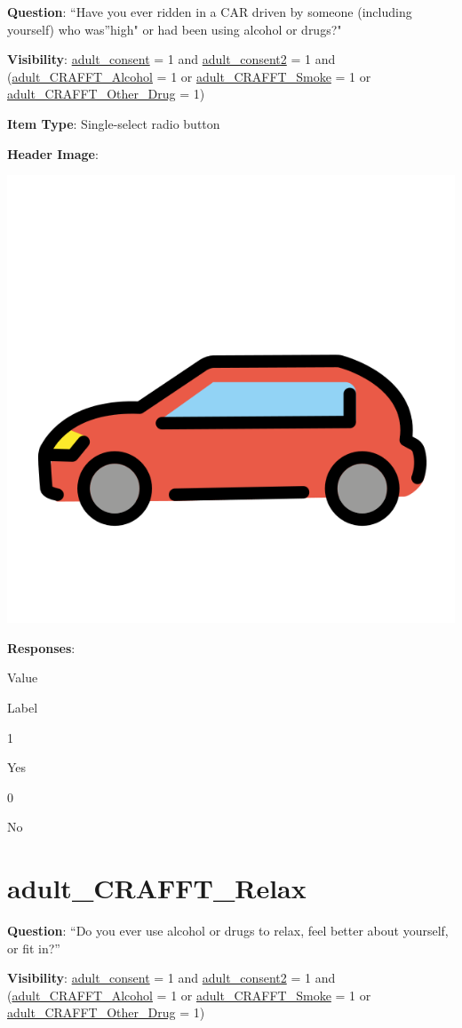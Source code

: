 \documentclass[]{book}
\begin{document}
\textbf{Question}: ``Have you ever ridden in a CAR driven by someone (including yourself) who was''high" or had been using alcohol or drugs?"

\textbf{Visibility}: \protect\hyperlink{adult_consent}{adult\_consent} = 1 and \protect\hyperlink{adult_consent2}{adult\_consent2} = 1 and (\protect\hyperlink{adult_crafft_alcohol}{adult\_CRAFFT\_Alcohol} = 1 or \protect\hyperlink{adult_crafft_smoke}{adult\_CRAFFT\_Smoke} = 1 or \protect\hyperlink{adult_crafft_other_drug}{adult\_CRAFFT\_Other\_Drug} = 1)

\textbf{Item Type}: Single-select radio button

\textbf{Header Image}:

\begin{flushleft}\includegraphics[width=0.33\linewidth]{downloadFigs4latex_HBN_PMHS_Codebook/adult_CRAFFT_Car_headerImg} \end{flushleft}

\textbf{Responses}:

Value

Label

1

Yes

0

No

\hypertarget{adult_crafft_relax}{%
\section{adult\_CRAFFT\_Relax}\label{adult_crafft_relax}}

\textbf{Question}: ``Do you ever use alcohol or drugs to relax, feel better about yourself, or fit in?''

\textbf{Visibility}: \protect\hyperlink{adult_consent}{adult\_consent} = 1 and \protect\hyperlink{adult_consent2}{adult\_consent2} = 1 and (\protect\hyperlink{adult_crafft_alcohol}{adult\_CRAFFT\_Alcohol} = 1 or \protect\hyperlink{adult_crafft_smoke}{adult\_CRAFFT\_Smoke} = 1 or \protect\hyperlink{adult_crafft_other_drug}{adult\_CRAFFT\_Other\_Drug} = 1)
\end{document}
